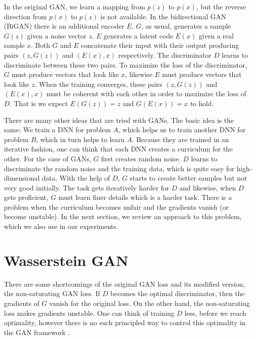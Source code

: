 \documentclass[a4paper,onesided,12pt]{report}
\begin{document}
In the original GAN, we learn a mapping from $p(z)$ to $p(x)$, but the reverse direction from $p(x)$ to $p(z)$ is not available. In the bidirectional GAN (BiGAN) \cite{donahue2016adversarial,dumoulin2016adversarially} there is an additional encoder $E$. $G$, as usual, generates a sample $G(z)$ given a noise vector $z$. $E$ generates a latent code $E(x)$ given a real sample $x$. Both $G$ and $E$ concatenate their input with their output producing pairs $(z, G(z))$ and $(E(x), x)$ respectively. The discriminator $D$ learns to discriminate between these two pairs. To maximize the loss of the discriminator, $G$ must produce vectors that look like $x$, likewise $E$ must produce vectors that look like $z$. When the training converges, these pairs $(z, G(z))$ and $(E(x), x)$ must be coherent with each other in order to maximize the loss of $D$. That is we expect $E(G(z))=z$  and $G(E(x))=x$ to hold.

There are many other ideas that are tried with GANs. The basic idea is the same: We train a DNN for problem $A$, which helps us to train another DNN for problem $B$, which in turn helps to learn $A$. Because they are trained in an iterative fashion, one can think that each DNN creates a curriculum for the other. For the case of GANs, $G$ first creates random noise. $D$ learns to discriminate the random noise and the training data, which is quite easy for high-dimensional data. With the help of $D$, $G$ starts to create better samples but not very good initially. The task gets iteratively harder for $D$ and likewise, when $D$ gets proficient, $G$ must learn finer details which is a harder task. There is a problem when the curriculum becomes unfair and the gradients vanish (or become unstable). In the next section, we review an approach to this problem, which we also use in our experiments.

\section{Wasserstein GAN}
\label{sec:wgan}
There are some shortcomings of the original GAN loss and its modified version, the non-saturating GAN loss. If $D$ becomes the optimal discriminator, then the gradients of $G$ vanish for the original loss. On the other hand, the non-saturating loss makes gradients unstable. One can think of training $D$ less, before we reach optimality, however there is no such principled way to control this optimality in the GAN framework \cite{arjovsky2017towards}.
\end{document}
